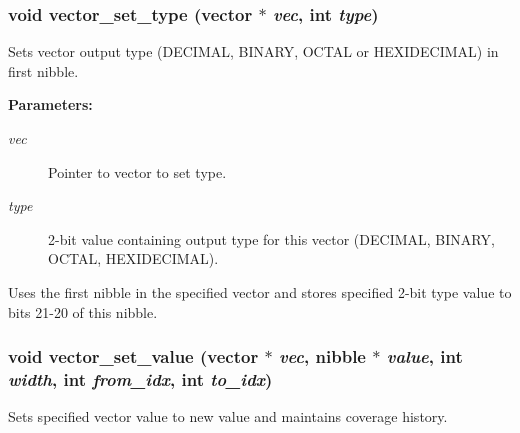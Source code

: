 \subsubsection{\setlength{\rightskip}{0pt plus 5cm}void vector\_\-set\_\-type ({\bf vector} $\ast$ {\em vec}, int {\em type})}\label{vector_8h_a13}


Sets vector output type (DECIMAL, BINARY, OCTAL or HEXIDECIMAL) in first nibble.

\begin{Desc}
\item[{\bf Parameters: }]\par
\begin{description}
\item[
{\em vec}]Pointer to vector to set type. \item[
{\em type}]2-bit value containing output type for this vector (DECIMAL, BINARY, OCTAL, HEXIDECIMAL).

\end{description}
\end{Desc}
Uses the first nibble in the specified vector and stores specified 2-bit type value to bits 21-20 of this nibble. 
\subsubsection{\setlength{\rightskip}{0pt plus 5cm}void vector\_\-set\_\-value ({\bf vector} $\ast$ {\em vec}, {\bf nibble} $\ast$ {\em value}, int {\em width}, int {\em from\_\-idx}, int {\em to\_\-idx})}\label{vector_8h_a12}


Sets specified vector value to new value and maintains coverage history.

